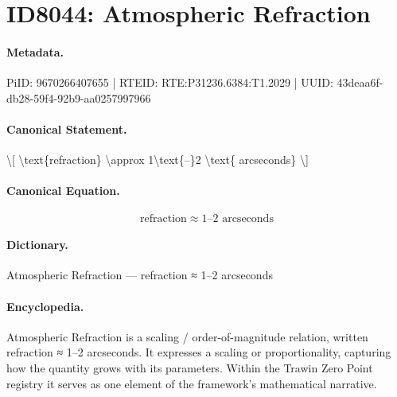 \section*{ID8044: Atmospheric Refraction}
\paragraph{Metadata.}
PiID: 9670266407655 | RTEID: RTE:P31236.6384:T1.2029 | UUID: 43deaa6f-db28-59f4-92b9-aa0257997966

\paragraph{Canonical Statement.}
\textbackslash{}[ \textbackslash{}text\{refraction\} \textbackslash{}approx 1\textbackslash{}text\{–\}2 \textbackslash{}text\{ arcseconds\} \textbackslash{}]

\paragraph{Canonical Equation.}
\[
\text{refraction} \approx 1\text{–}2 \text{ arcseconds}
\]

\paragraph{Dictionary.}
Atmospheric Refraction — refraction ≈ 1–2 arcseconds

\paragraph{Encyclopedia.}
Atmospheric Refraction is a scaling / order-of-magnitude relation, written refraction ≈ 1–2 arcseconds. It expresses a scaling or proportionality, capturing how the quantity grows with its parameters. Within the Trawin Zero Point registry it serves as one element of the framework's mathematical narrative.
